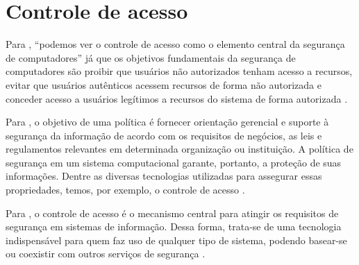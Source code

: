 



\section{Controle de acesso}\label{sec:controle_acesso}
Para , ``podemos ver o controle de acesso como o elemento central da segurança de computadores'' já que os objetivos fundamentais da segurança de computadores são proibir  que usuários não autorizados tenham acesso a recursos, evitar que usuários autênticos acessem recursos de forma não autorizada e conceder acesso a usuários legítimos a recursos do sistema de forma autorizada \cite[p. 97]{stallings_seguranccomputadores_2017}.

Para , o objetivo de uma política é fornecer orientação gerencial e suporte à segurança da informação de acordo com os requisitos de negócios, as leis e regulamentos relevantes em determinada organização ou instituição. A política de segurança em um sistema computacional garante, portanto, a proteção de suas informações. Dentre as diversas tecnologias utilizadas para assegurar essas propriedades, temos, por exemplo, o controle de acesso \cite{samarati_access_2001}. %

Para  , o controle de acesso é o mecanismo central para atingir os requisitos de segurança em  sistemas  de  informação. Dessa forma,  trata-se  de  uma  tecnologia indispensável para quem faz uso de qualquer tipo de sistema, podendo basear-se ou coexistir com outros serviços de segurança \cite{sandhu:1996}.

